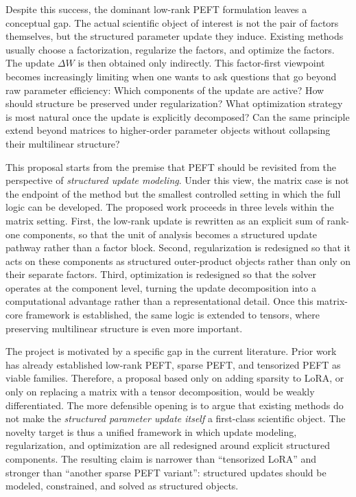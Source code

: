 \documentclass[11pt]{article}
\begin{document}
Despite this success, the dominant low-rank PEFT formulation leaves a conceptual gap. The actual scientific object of interest is not the pair of factors themselves, but the structured parameter update they induce. Existing methods usually choose a factorization, regularize the factors, and optimize the factors. The update $\Delta W$ is then obtained only indirectly. This factor-first viewpoint becomes increasingly limiting when one wants to ask questions that go beyond raw parameter efficiency: Which components of the update are active? How should structure be preserved under regularization? What optimization strategy is most natural once the update is explicitly decomposed? Can the same principle extend beyond matrices to higher-order parameter objects without collapsing their multilinear structure?

This proposal starts from the premise that PEFT should be revisited from the perspective of \emph{structured update modeling}. Under this view, the matrix case is not the endpoint of the method but the smallest controlled setting in which the full logic can be developed. The proposed work proceeds in three levels within the matrix setting. First, the low-rank update is rewritten as an explicit sum of rank-one components, so that the unit of analysis becomes a structured update pathway rather than a factor block. Second, regularization is redesigned so that it acts on these components as structured outer-product objects rather than only on their separate factors. Third, optimization is redesigned so that the solver operates at the component level, turning the update decomposition into a computational advantage rather than a representational detail. Once this matrix-core framework is established, the same logic is extended to tensors, where preserving multilinear structure is even more important.

The project is motivated by a specific gap in the current literature. Prior work has already established low-rank PEFT, sparse PEFT, and tensorized PEFT as viable families. Therefore, a proposal based only on adding sparsity to LoRA, or only on replacing a matrix with a tensor decomposition, would be weakly differentiated. The more defensible opening is to argue that existing methods do not make the \emph{structured parameter update itself} a first-class scientific object. The novelty target is thus a unified framework in which update modeling, regularization, and optimization are all redesigned around explicit structured components. The resulting claim is narrower than ``tensorized LoRA'' and stronger than ``another sparse PEFT variant'': structured updates should be modeled, constrained, and solved as structured objects.
\end{document}
